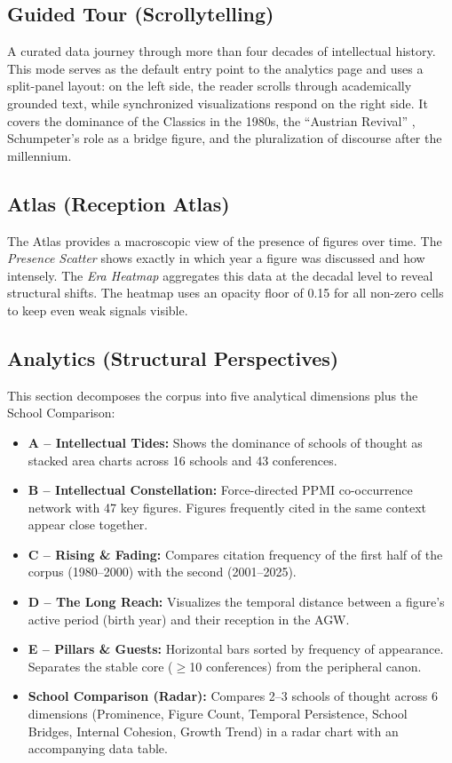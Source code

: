 \documentclass[11pt,a4paper,twoside]{article}
\begin{document}
\subsection{Guided Tour (Scrollytelling)}
A curated data journey through more than four decades of intellectual history. This mode serves as the default entry point to the analytics page and uses a split-panel layout: on the left side, the reader scrolls through academically grounded text, while synchronized visualizations respond on the right side. It covers the dominance of the Classics in the 1980s, the ``Austrian Revival'' \cite{vaughn1994}, Schumpeter's role as a bridge figure, and the pluralization of discourse after the millennium.

\subsection{Atlas (Reception Atlas)}
The Atlas provides a macroscopic view of the presence of figures over time. The \textit{Presence Scatter} shows exactly in which year a figure was discussed and how intensely. The \textit{Era Heatmap} aggregates this data at the decadal level to reveal structural shifts. The heatmap uses an opacity floor of 0.15 for all non-zero cells to keep even weak signals visible.

\subsection{Analytics (Structural Perspectives)}
This section decomposes the corpus into five analytical dimensions plus the School Comparison:
\begin{itemize}[leftmargin=*,itemsep=2pt,topsep=2pt]
    \item \textbf{A -- Intellectual Tides:} Shows the dominance of schools of thought as stacked area charts across 16 schools and 43 conferences.
    \item \textbf{B -- Intellectual Constellation:} Force-directed PPMI co-occurrence network with 47 key figures. Figures frequently cited in the same context appear close together.
    \item \textbf{C -- Rising \& Fading:} Compares citation frequency of the first half of the corpus (1980--2000) with the second (2001--2025).
    \item \textbf{D -- The Long Reach:} Visualizes the temporal distance between a figure's active period (birth year) and their reception in the AGW.
    \item \textbf{E -- Pillars \& Guests:} Horizontal bars sorted by frequency of appearance. Separates the stable core ($\geq$10 conferences) from the peripheral canon.
    \item \textbf{School Comparison (Radar):} Compares 2--3 schools of thought across 6 dimensions (Prominence, Figure Count, Temporal Persistence, School Bridges, Internal Cohesion, Growth Trend) in a radar chart with an accompanying data table.
\end{itemize}
\end{document}
